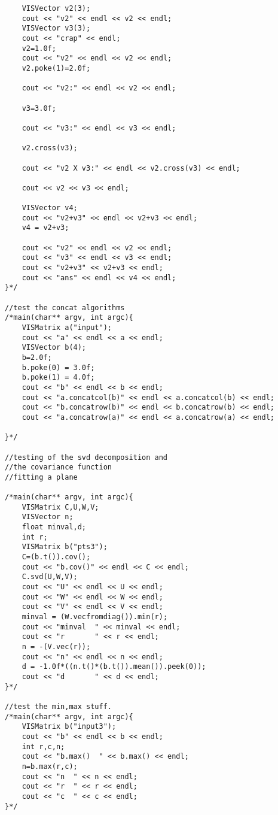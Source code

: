 \begin{appendix}
\begin{verbatim}
    VISVector v2(3);
    cout << "v2" << endl << v2 << endl;
    VISVector v3(3);
    cout << "crap" << endl;
    v2=1.0f;
    cout << "v2" << endl << v2 << endl;
    v2.poke(1)=2.0f;
    
    cout << "v2:" << endl << v2 << endl;
    
    v3=3.0f;
    
    cout << "v3:" << endl << v3 << endl;
    
    v2.cross(v3);
    
    cout << "v2 X v3:" << endl << v2.cross(v3) << endl;

    cout << v2 << v3 << endl;
    
    VISVector v4;
    cout << "v2+v3" << endl << v2+v3 << endl;
    v4 = v2+v3;

    cout << "v2" << endl << v2 << endl;
    cout << "v3" << endl << v3 << endl;
    cout << "v2+v3" << v2+v3 << endl;
    cout << "ans" << endl << v4 << endl;
}*/

//test the concat algorithms
/*main(char** argv, int argc){
    VISMatrix a("input");
    cout << "a" << endl << a << endl;
    VISVector b(4);
    b=2.0f;
    b.poke(0) = 3.0f;
    b.poke(1) = 4.0f;
    cout << "b" << endl << b << endl;
    cout << "a.concatcol(b)" << endl << a.concatcol(b) << endl;
    cout << "b.concatrow(b)" << endl << b.concatrow(b) << endl;
    cout << "a.concatrow(a)" << endl << a.concatrow(a) << endl;

}*/

//testing of the svd decomposition and
//the covariance function
//fitting a plane

/*main(char** argv, int argc){
    VISMatrix C,U,W,V;
    VISVector n;
    float minval,d;
    int r;
    VISMatrix b("pts3");
    C=(b.t()).cov();
    cout << "b.cov()" << endl << C << endl;
    C.svd(U,W,V);
    cout << "U" << endl << U << endl;
    cout << "W" << endl << W << endl;
    cout << "V" << endl << V << endl;
    minval = (W.vecfromdiag()).min(r);
    cout << "minval  " << minval << endl;
    cout << "r       " << r << endl;
    n = -(V.vec(r));
    cout << "n" << endl << n << endl;
    d = -1.0f*((n.t()*(b.t()).mean()).peek(0));
    cout << "d       " << d << endl;
}*/

//test the min,max stuff.
/*main(char** argv, int argc){
    VISMatrix b("input3");
    cout << "b" << endl << b << endl;
    int r,c,n;
    cout << "b.max()  " << b.max() << endl;
    n=b.max(r,c);
    cout << "n  " << n << endl;
    cout << "r  " << r << endl;
    cout << "c  " << c << endl;
}*/


\end{verbatim}
\end{appendix}
